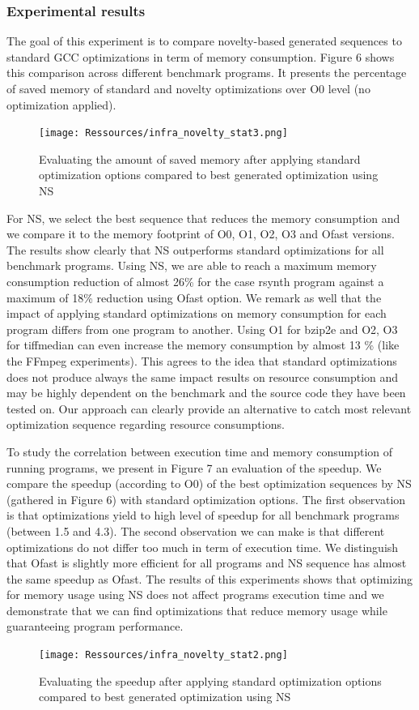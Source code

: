 \subsubsection{Experimental results}

The goal of this experiment is to compare novelty-based generated sequences to standard GCC optimizations in term of memory consumption. Figure 6 shows this comparison across different benchmark programs. It presents the percentage of saved memory of standard and novelty optimizations over O0 level (no optimization applied).
 
\begin{figure}[!ht]
	\centering
	\texttt{[image: Ressources/infra\_novelty\_stat3.png]}
	\caption{Evaluating the amount of saved memory after applying standard optimization options compared to best generated optimization using NS}
\end{figure}

For NS, we select the best sequence that reduces the memory consumption and we compare it to the memory footprint of O0, O1, O2, O3 and Ofast versions. The results show clearly that NS outperforms standard optimizations for all benchmark programs. Using NS, we are able to reach a maximum memory consumption reduction of almost 26\% for the case rsynth program against a maximum of 18\% reduction using Ofast option. We remark as well that the impact of applying standard optimizations on memory consumption for each program differs from one program to another. Using O1 for bzip2e and O2, O3 for tiffmedian can even increase the memory consumption by almost 13 \% (like the FFmpeg experiments). This agrees to the idea that standard optimizations does not produce always the same impact results on resource consumption and may be highly dependent on the benchmark and the source code they have been tested on. Our approach can clearly provide an alternative to catch most relevant optimization sequence regarding resource consumptions.

To study the correlation between execution time and memory consumption of running programs, we present in Figure 7 an evaluation of the speedup. We compare the speedup (according to O0) of the best optimization sequences by NS (gathered in Figure 6) with standard optimization options. 
The first observation is that optimizations yield to high level of speedup for all benchmark programs (between 1.5 and 4.3).
The second observation we can make is that different optimizations do not differ too much in term of execution time. We  distinguish that Ofast is slightly more efficient for all programs and NS sequence has almost the same speedup as Ofast. 
The results of this experiments shows that optimizing for memory usage using NS does not affect programs execution time and we demonstrate that we can find optimizations that reduce memory usage while guaranteeing program performance.
\begin{figure}[!ht]
	\centering
	\texttt{[image: Ressources/infra\_novelty\_stat2.png]}
	\caption{Evaluating the speedup after applying standard optimization options compared to best generated optimization using NS}
\end{figure}

